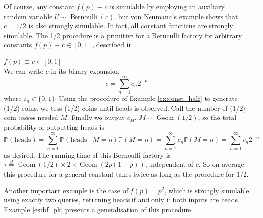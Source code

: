 \documentclass{article}
\theoremstyle{definition}
\newenvironment{example}
  {\pushQED{\qed}\renewcommand{\qedsymbol}{$\triangle$}\examplex}
  {\popQED\endexamplex}
\newcommand{\PR}{\mathbb{P}}
\newcommand{\eqdist}{\overset{d}{=}}
\newcommand{\Bern}{\operatorname{Bernoulli}}
\newcommand{\Geom}{\operatorname{Geom}}
\begin{document}
Of course, any constant $f(p)\equiv c$ is simulable by employing an auxiliary random variable $U\sim \Bern(c)$, but von Neumann's example shows that $c=1/2$ is also strongly simulable.
In fact, all constant functions are strongly simulable. The 1/2 procedure is a primitive for a Bernoulli factory for arbitrary constants $f(p)\equiv c\in[0,1]$, described in \citet[Proposition 13]{nacu2005}.

\begin{example}\label{ex:general_const}
$f(p)\equiv c\in[0,1]$ \\
We can write $c$ in its binary expansion
\begin{equation*}
c = \sum_{n=1}^\infty c_n 2^{-n}
\end{equation*}
where $c_n \in \{0,1\}$.
Using the procedure of Example \ref{ex:const_half} to generate (1/2)-coins, we toss (1/2)-coins until heads is observed. Call the number of (1/2)-coin tosses needed $M$. Finally we output $c_M$.
$M \sim \Geom(1/2)$, so the total probability of outputting heads is
\begin{equation*}
\PR(\text{heads}) = \sum_{n=1}^\infty \PR(\text{heads} \mid M=n) \PR(M=n) = \sum_{n=1}^\infty c_n \PR(M=n) = \sum_{n=1}^\infty c_n 2^{-n}
\end{equation*}
as desired.
The running time of this Bernoulli factory is $\tau \eqdist \Geom(1/2)\times 2 \times \Geom(2p(1-p))$, independent of $c$. So on average this procedure for a general constant takes twice as long as the procedure for 1/2.
\end{example}

Another important example is the case of $f(p)=p^2$, which is strongly simulable using exactly two queries, returning heads if and only if both inputs are heads. Example \ref{ex:bf_pk} presents a generalisation of this procedure.
\end{document}
